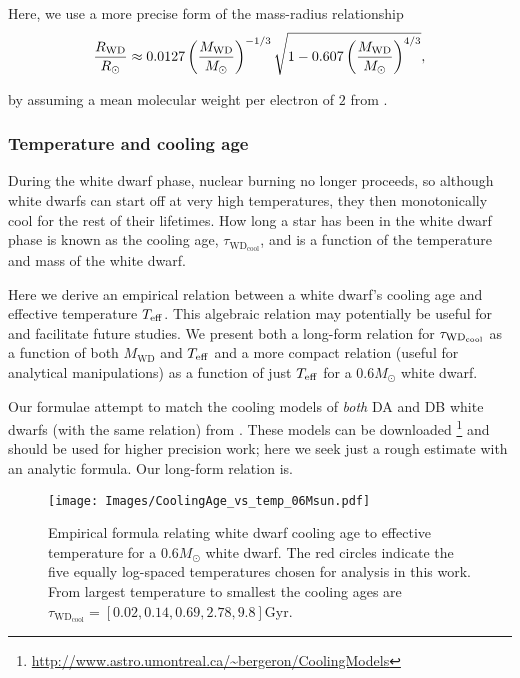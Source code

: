 \documentclass[fleqn,usenatbib]{mnras}
\begin{document}
Here, we use a more precise form of the mass-radius relationship \citep[eqs 27-28 of][]{Nauenberg1972}
\begin{equation}
\frac{R_{\rm WD}}{R_{\odot}}
\approx
0.0127 
\left( \frac{M_{\rm WD}}{M_{\odot}} \right)^{-1/3}
\sqrt{
1 - 0.607
\left( \frac{M_{\rm WD}}{M_{\odot}} \right)^{4/3}
}
,
\label{eq:mass-radius_Nau}
\end{equation}

\noindent by assuming a mean molecular weight per electron of $2$ from \cite{Hamada1961}.

\subsubsection{Temperature and cooling age} \label{subsubsec:wdtemp_cool}

During the white dwarf phase, nuclear burning no longer proceeds, so although white dwarfs can start off at very high temperatures, they then monotonically cool for the rest of their lifetimes.
How long a star has been in the white dwarf phase is known as the cooling age, $\tau_{{\text{WD}}_{\text{cool}}}$, and is a function of the temperature and mass of the white dwarf.

Here we derive an empirical relation between a white dwarf's cooling age and effective temperature $T_{\rm eff}$. This algebraic relation may potentially be useful for and facilitate future studies. We present both a long-form relation for $\tau_{{\rm WD}_{\rm cool}}$ as a function of both $M_\text{WD}$ and $T_{\rm eff}$ and a more compact relation (useful for analytical manipulations) as a function of just $T_{\rm eff}$ for a $0.6 M_\odot$ white dwarf.

Our formulae attempt to match the cooling models of {\it both} DA and DB white dwarfs (with the same relation) from \cite{Fontaine2001}. These models can be downloaded
\footnote{\url{http://www.astro.umontreal.ca/~bergeron/CoolingModels}} and should be used for higher precision work; here we seek just a rough estimate with an analytic formula. Our long-form relation is. 

\begin{figure}
	\texttt{[image: Images/CoolingAge\_vs\_temp\_06Msun.pdf]}
    \caption{Empirical formula relating white dwarf cooling age to effective temperature for a $0.6M_\odot$ white dwarf.
    The red circles indicate the five equally log-spaced temperatures chosen for analysis in this work. 
    From largest temperature to smallest the cooling ages are $\tau_{\text{WD}_\text{cool}} = [0.02, 0.14, 0.69, 2.78, 9.8]$Gyr.}
    \label{fig:WD_cooling_age}
\end{figure}
\end{document}
